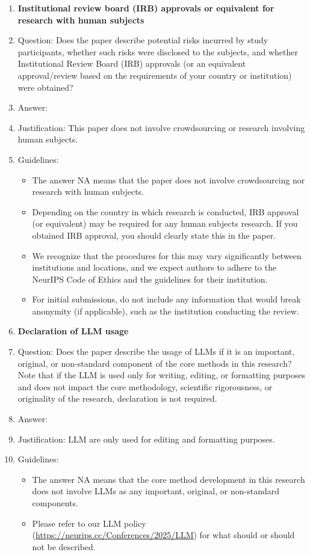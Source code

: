 \documentclass{article}
\begin{document}
\begin{enumerate}
\item {\bf Institutional review board (IRB) approvals or equivalent for research with human subjects}
    \item[] Question: Does the paper describe potential risks incurred by study participants, whether such risks were disclosed to the subjects, and whether Institutional Review Board (IRB) approvals (or an equivalent approval/review based on the requirements of your country or institution) were obtained?
    \item[] Answer: \answerNA{} %
    \item[] Justification: This paper does not involve crowdsourcing or research involving human subjects.
    \item[] Guidelines:
    \begin{itemize}
        \item The answer NA means that the paper does not involve crowdsourcing nor research with human subjects.
        \item Depending on the country in which research is conducted, IRB approval (or equivalent) may be required for any human subjects research. If you obtained IRB approval, you should clearly state this in the paper. 
        \item We recognize that the procedures for this may vary significantly between institutions and locations, and we expect authors to adhere to the NeurIPS Code of Ethics and the guidelines for their institution. 
        \item For initial submissions, do not include any information that would break anonymity (if applicable), such as the institution conducting the review.
    \end{itemize}

\item {\bf Declaration of LLM usage}
    \item[] Question: Does the paper describe the usage of LLMs if it is an important, original, or non-standard component of the core methods in this research? Note that if the LLM is used only for writing, editing, or formatting purposes and does not impact the core methodology, scientific rigorousness, or originality of the research, declaration is not required.
    \item[] Answer: \answerNA{} %
    \item[] Justification: LLM are only used for editing and formatting purposes.
    \item[] Guidelines:
    \begin{itemize}
        \item The answer NA means that the core method development in this research does not involve LLMs as any important, original, or non-standard components.
        \item Please refer to our LLM policy (\url{https://neurips.cc/Conferences/2025/LLM}) for what should or should not be described.
    \end{itemize}

\end{enumerate}
\end{document}
